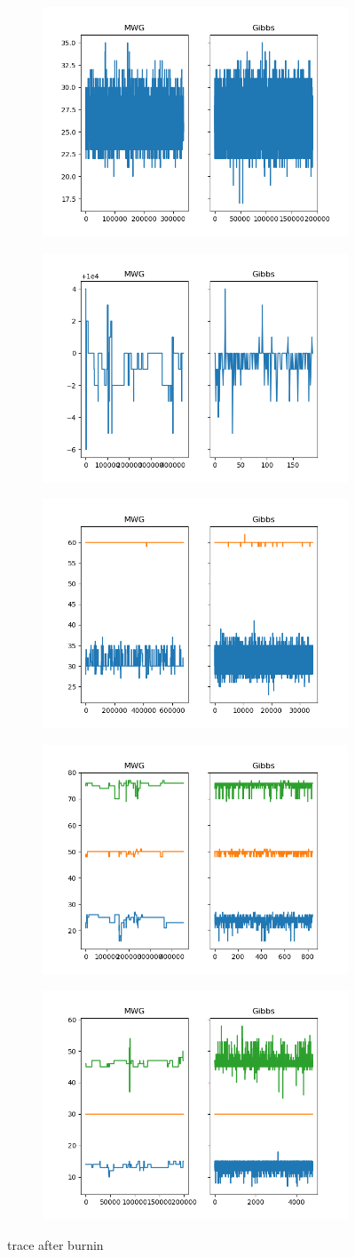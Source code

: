 \begin{figure}[h]
    \centering
    \begin{subfigure}
    	\centering
        \includegraphics[width=0.3\linewidth]{../../plots/Trace_post_burnin_M2_N50_NMCMC1_seed3_diffind2.png}
    \end{subfigure}
    \begin{subfigure}
        \centering
    	\includegraphics[width=0.3\linewidth]{../../plots/Trace_post_burnin_M2_N20000_NMCMC3_seed3_diffind2.png}
	\end{subfigure}
	\begin{subfigure}
	    \centering
    	\includegraphics[width=0.3\linewidth]{../../plots/Trace_post_burnin_M3_N100_NMCMC3_seed3_diffind2.png}
	\end{subfigure}
	\begin{subfigure}
	    \centering
    	\includegraphics[width=0.3\linewidth]{../../plots/Trace_post_burnin_M4_N100_NMCMC3_seed3_diffind2.png}
	\end{subfigure}
	\begin{subfigure}
	    \centering
    	\includegraphics[width=0.3\linewidth]{../../plots/Trace_post_burnin_M4_N60_NMCMC3_seed3_diffind2.png}
	\end{subfigure}
	\caption{trace after burnin}
\end{figure}

